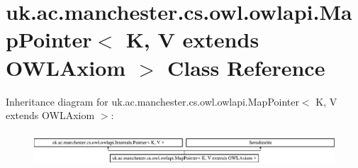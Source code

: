 \hypertarget{classuk_1_1ac_1_1manchester_1_1cs_1_1owl_1_1owlapi_1_1_map_pointer_3_01_k_00_01_v_01extends_01_o_w_l_axiom_01_4}{\section{uk.\-ac.\-manchester.\-cs.\-owl.\-owlapi.\-Map\-Pointer$<$ K, V extends O\-W\-L\-Axiom $>$ Class Reference}
\label{classuk_1_1ac_1_1manchester_1_1cs_1_1owl_1_1owlapi_1_1_map_pointer_3_01_k_00_01_v_01extends_01_o_w_l_axiom_01_4}
}
Inheritance diagram for uk.\-ac.\-manchester.\-cs.\-owl.\-owlapi.\-Map\-Pointer$<$ K, V extends O\-W\-L\-Axiom $>$\-:\begin{figure}[H]
\begin{center}
\leavevmode
\includegraphics[height=1.290323cm]{classuk_1_1ac_1_1manchester_1_1cs_1_1owl_1_1owlapi_1_1_map_pointer_3_01_k_00_01_v_01extends_01_o_w_l_axiom_01_4}
\end{center}
\end{figure}
